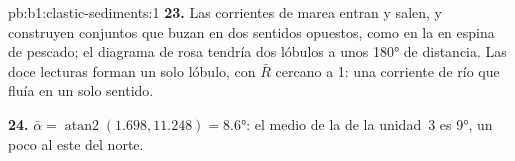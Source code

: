 \begin{solution}{pb:b1:clastic-sediments:1}
\textbf{23.} Las corrientes de marea entran y salen, y construyen conjuntos que buzan en dos sentidos opuestos, como en la  en espina de pescado; el diagrama de rosa tendría
dos lóbulos a unos \ang{180} de distancia. Las doce lecturas forman un solo lóbulo, con $\bar R$ cercano a 1: una corriente de río que fluía en un solo sentido.

\textbf{24.} $\bar\alpha = \operatorname{atan2}(1.698, 11.248) = \ang{8.6}$: el  medio de la  de la unidad~3 es \ang{9}, un poco al este del norte.
\end{solution}
